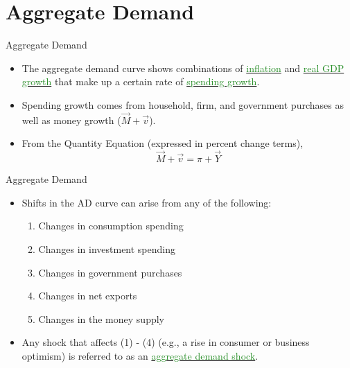 \documentclass[xcolor={dvipsnames},pdf, hyperref={colorlinks=true, citecolor=ForestGreen, linkcolor=BlueViolet, urlcolor=Magenta}]{beamer}
\theoremstyle{definition}
\newcommand{\dd}[1]{{\underline{\textcolor{ForestGreen}{#1}}}}
\begin{document}
\section{Aggregate Demand}

\begin{frame}{Aggregate Demand}
	\begin{itemize}
		\item The aggregate demand curve shows combinations of \dd{inflation} and \dd{real GDP growth} that make up a certain rate of \dd{spending growth}. 
		\item Spending growth comes from household, firm, and government purchases as well as money growth ($\vec{M} + \vec{v}$). 
		\item From the Quantity Equation (expressed in percent change terms),  \[\vec{M} + \vec{v} = \pi + \vec{Y}\] 
	\end{itemize}
\end{frame}


\begin{frame}{Aggregate Demand}
	\begin{itemize}
		\item Shifts in the AD curve can arise from any of the following:
		\begin{enumerate}
			\item Changes in consumption spending
			\item Changes in investment spending
			\item Changes in government purchases
			\item Changes in net exports
			\item Changes in the money supply
		\end{enumerate}
	\item Any shock that affects (1) - (4) (e.g., a rise in consumer or business optimism) is referred to as an \dd{aggregate demand shock}.
	\end{itemize}
\end{frame}
\end{document}
